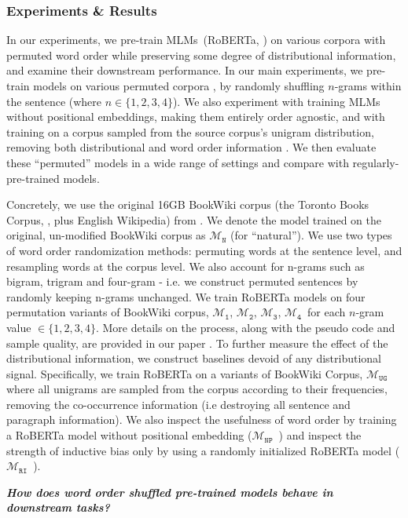 \documentclass[12pt]{article}
\newcommand{\xit}[1]{{\noindent\textbf{\textit{#1}}}}
\newcommand{\OR}{$\mathcal{M}_{\texttt{N}}$}
\newcommand{\RI}{$\mathcal{M}_{\texttt{1}}$}
\newcommand{\RII}{$\mathcal{M}_{\texttt{2}}$}
\newcommand{\RIII}{$\mathcal{M}_{\texttt{3}}$}
\newcommand{\RIV}{$\mathcal{M}_{\texttt{4}}$}
\newcommand{\RC}{$\mathcal{M}_{\texttt{UG}}$}
\newcommand{\RT}{$\mathcal{M}_{\texttt{RI}}$}
\newcommand{\NP}{$\mathcal{M}_{\texttt{NP}}$}
\begin{document}
\subsubsection{Experiments \& Results}

In our experiments, we pre-train MLMs~(RoBERTa, \cite{liu2019b}) on various corpora with permuted word order while preserving some degree of distributional information, and examine their downstream performance.
In our main experiments, we pre-train models on various permuted corpora , by randomly shuffling $n$-grams within the sentence (where $n \in \{1,2,3,4\}$).
We also experiment with training MLMs without positional embeddings, making them entirely order agnostic,
and with training on a corpus sampled from the source corpus's %
unigram distribution, removing both distributional and word order information
. We then evaluate these ``permuted'' models in a wide range of settings and compare with regularly-pre-trained models.

Concretely, we use the original 16GB BookWiki corpus (the Toronto Books Corpus, \cite{zhu2015aligning}, plus English Wikipedia) from \cite{liu2019b}. We denote the model trained on the original, un-modified BookWiki corpus as \OR{} (for ``natural''). We use two types of word order randomization methods: permuting words at the sentence level, and resampling words at the corpus level. We also account for n-grams such as bigram, trigram and four-gram - i.e. we construct permuted sentences by randomly keeping n-grams unchanged. We train RoBERTa models on four permutation variants of BookWiki corpus, \RI, \RII, \RIII, \RIV\ for each $n$-gram value $ \in {\{1,2,3,4\}}$. More details on the process, along with the pseudo code and sample quality, are provided in our paper \cite{sinha2021a}. To further measure the effect of the distributional information, we construct baselines devoid of any distributional signal. Specifically, we train RoBERTa on a variants of BookWiki Corpus, \RC\, where all unigrams are sampled from the corpus according to their frequencies, removing the co-occurrence information (i.e destroying all sentence and paragraph information). We also inspect the usefulness of word order by training a RoBERTa model without positional embedding (\NP\ ) and inspect the strength of inductive bias only by using a randomly initialized RoBERTa model (\RT\ ).

\blankline

\xit{How does word order shuffled pre-trained models behave in downstream tasks?}
\end{document}
